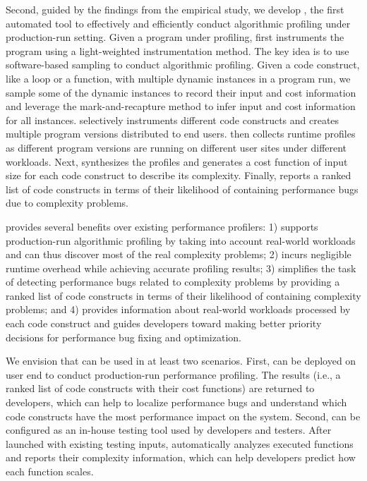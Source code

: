 Second, guided by the findings from the empirical
study, we develop \Tool, the first automated tool to effectively and efficiently 
conduct algorithmic profiling under production-run setting.
Given a program under profiling, \Tool first instruments the program
using a light-weighted instrumentation method. 
The key idea is to use software-based sampling to conduct algorithmic profiling.
Given a code construct, like a loop or a function,  
with multiple dynamic instances in a program run,
we sample some of the dynamic instances to record their input and cost information
and leverage the mark-and-recapture
method \citep{mark-recapture} to infer input and cost information for all instances.
\Tool selectively instruments different code constructs and 
creates multiple program versions distributed to end users.
\Tool then collects runtime profiles as different program versions are running
on different user sites under different workloads.
Next, \Tool synthesizes the profiles and generates a cost function of input size
for each code construct to describe its complexity. 
Finally, \Tool  reports a ranked list of code constructs in terms of their likelihood
of containing performance bugs due to complexity problems. 




\Tool provides several benefits over existing performance profilers:
1) \Tool supports production-run algorithmic profiling by taking into account
real-world workloads and can thus discover most of the real complexity problems;
2) \Tool incurs negligible runtime overhead while achieving accurate profiling results;
3) \Tool  simplifies the task of detecting performance bugs related to complexity
problems by providing a ranked list of code constructs in terms of their
likelihood of containing complexity problems;
and 4) \Tool provides information about real-world workloads 
processed by each code construct and guides developers toward making better priority 
decisions for performance bug fixing and optimization.


We envision that \Tool can be used in at least two scenarios. 
First, \Tool can be deployed on user end to conduct production-run performance
profiling. The results (i.e., a ranked list of code constructs with their cost functions)
are returned to developers, which can help to localize performance 
bugs and understand 
which code constructs have the most performance impact on the system.
Second, \Tool can be configured as an in-house testing tool used by 
developers and testers. After launched with existing testing inputs, 
\Tool  automatically analyzes executed functions and 
reports their complexity information,
which can help developers predict how each function scales. 




